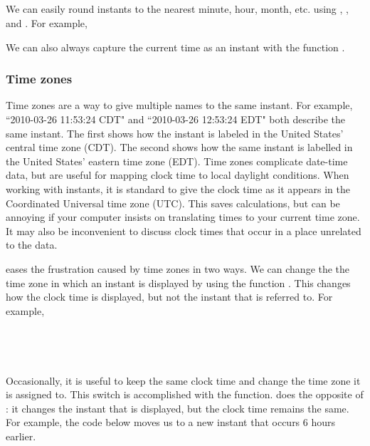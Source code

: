 \documentclass[article]{jss}
\begin{document}
\\
\\

\\
\\

We can easily round instants to the nearest minute, hour, month, etc. using , , and . For example,


We can also always capture the current time as an instant with the function .

\subsubsection{Time zones}
\label{sec:tz}

Time zones are a way to give multiple names to the same instant. For example, ``2010-03-26 11:53:24 CDT" and ``2010-03-26 12:53:24 EDT" both describe the same instant. The first shows how the instant is labeled in the United States' central time zone (CDT). The second shows how the same instant is labelled in the United States' eastern time zone (EDT). Time zones complicate date-time data, but are useful for mapping clock time to local daylight conditions. When working with instants, it is standard to give the clock time as it appears in the Coordinated Universal time zone (UTC).  This saves calculations, but can be annoying if your computer insists on translating times to your current time zone.  It may also be inconvenient to discuss clock times that occur in a place unrelated to the data.

 eases the frustration caused by time zones in two ways. We can change the the time zone in which an instant is displayed by using the function . This changes how the clock time is displayed, but not the instant that is referred to. For example,\\

\\
\\
\\
\\

Occasionally, it is useful to keep the same clock time and change the time zone it is assigned to. This switch is accomplished with the  function.  does the opposite of : it changes the instant that is displayed, but the clock time remains the same. For example, the code below moves us to a new instant that occurs 6 hours earlier.\\
\end{document}
